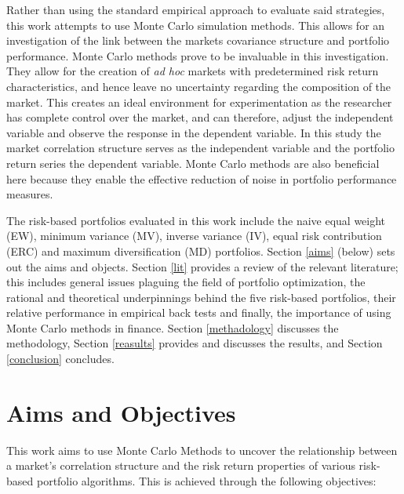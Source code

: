 \documentclass[11pt,preprint, authoryear]{elsarticle}
\numberwithin{equation}{section}
\numberwithin{figure}{section}
\numberwithin{table}{section}
\begin{document}
Rather than using the standard empirical approach to evaluate said
strategies, this work attempts to use Monte Carlo simulation methods.
This allows for an investigation of the link between the markets
covariance structure and portfolio performance. Monte Carlo methods
prove to be invaluable in this investigation. They allow for the
creation of \emph{ad hoc} markets with predetermined risk return
characteristics, and hence leave no uncertainty regarding the
composition of the market. This creates an ideal environment for
experimentation as the researcher has complete control over the market,
and can therefore, adjust the independent variable and observe the
response in the dependent variable. In this study the market correlation
structure serves as the independent variable and the portfolio return
series the dependent variable. Monte Carlo methods are also beneficial
here because they enable the effective reduction of noise in portfolio
performance measures.

The risk-based portfolios evaluated in this work include the naive equal
weight (EW), minimum variance (MV), inverse variance (IV), equal risk
contribution (ERC) and maximum diversification (MD) portfolios. Section
\ref{aims} (below) sets out the aims and objects. Section \ref{lit}
provides a review of the relevant literature; this includes general
issues plaguing the field of portfolio optimization, the rational and
theoretical underpinnings behind the five risk-based portfolios, their
relative performance in empirical back tests and finally, the importance
of using Monte Carlo methods in finance. Section \ref{methadology}
discusses the methodology, Section \ref{reasults} provides and discusses
the results, and Section \ref{conclusion} concludes.

\hypertarget{aims-and-objectives}{%
\section{\texorpdfstring{Aims and Objectives
\label{aims}}{Aims and Objectives }}\label{aims-and-objectives}}

This work aims to use Monte Carlo Methods to uncover the relationship
between a market's correlation structure and the risk return properties
of various risk-based portfolio algorithms. This is achieved through the
following objectives:
\end{document}
